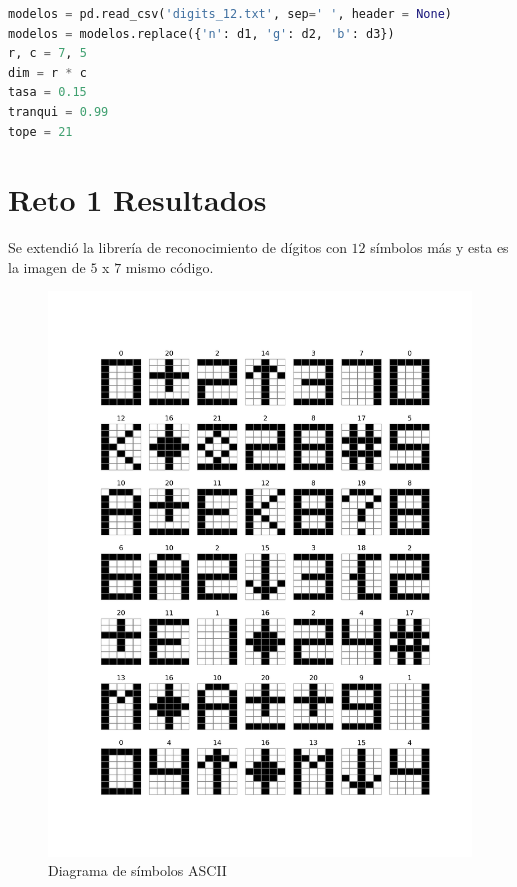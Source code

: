 \documentclass{article}
\begin{document}
\begin{lstlisting}[caption=Se hace la modificación de modelos de $7$ y $5$, language=Python]
modelos = pd.read_csv('digits_12.txt', sep=' ', header = None)
modelos = modelos.replace({'n': d1, 'g': d2, 'b': d3})
r, c = 7, 5
dim = r * c
tasa = 0.15
tranqui = 0.99
tope = 21
\end{lstlisting}


\section{Reto 1 Resultados}\label{}
Se extendió la librería de reconocimiento de dígitos con $12$ símbolos más y esta es la imagen de $5$ x $7$ mismo código.

\begin{figure}
    \centering
    \includegraphics[width=190mm]{Figure_3.png}
    \caption{Diagrama de símbolos ASCII}
    \label{figure}
\end{figure}
\end{document}
